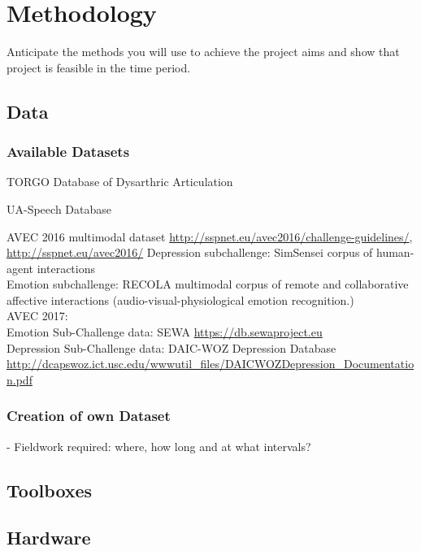 \chapter{Methodology}
\label{cha:methods}



Anticipate the methods you will use to achieve the project aims and show that project is feasible in the time period.

\section{Data}

\subsection{Available Datasets}

TORGO Database of Dysarthric Articulation

UA-Speech Database

AVEC 2016 multimodal dataset \url{http://sspnet.eu/avec2016/challenge-guidelines/}, \url{http://sspnet.eu/avec2016/}
Depression subchallenge: SimSensei corpus of human-agent interactions\\
Emotion subchallenge: RECOLA multimodal corpus of remote and collaborative affective interactions (audio-visual-physiological emotion recognition.)\\

AVEC 2017: \\
Emotion Sub-Challenge data: SEWA \url{https://db.sewaproject.eu}\\
Depression Sub-Challenge data: DAIC-WOZ Depression Database \url{http://dcapswoz.ict.usc.edu/wwwutil_files/DAICWOZDepression_Documentation.pdf}

\subsection{Creation of own Dataset}
- Fieldwork required: where, how long and at what intervals?


\section{Toolboxes}


\section{Hardware}





